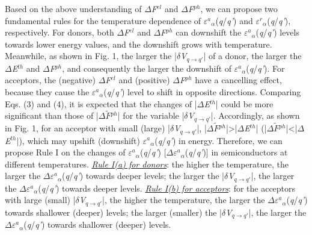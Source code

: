 \documentclass[onecolumn,preprint,superscriptaddress]{revtex4-1}
\begin{document}
Based on the above understanding of $\Delta$\emph{F}$^{el}$ and $\Delta$\emph{F}$^{ph}$, we can propose two fundamental rules for the temperature dependence of $\varepsilon$$^{a}$$_{\alpha}$(\emph{q}/\emph{q'}) and $\varepsilon$$^{r}$$_{\alpha}$(\emph{q}/\emph{q'}), respectively. For donors, both $\Delta$\emph{F}$^{el}$ and $\Delta$\emph{F}$^{ph}$ can downshift the $\varepsilon$$^{a}$$_{\alpha}$(\emph{q}/\emph{q'}) levels towards lower energy values, and the downshift grows with temperature. Meanwhile, as shown in Fig. 1, the larger the |$\delta$\emph{V}$_{q\rightarrow q'}$| of a donor, the larger the $\Delta$\emph{E}$^{th}$ and $\Delta$\emph{F}$^{ph}$, and consequently the larger the downshift of $\varepsilon$$^{a}$$_{\alpha}$(\emph{q}/\emph{q'}). For acceptors, the (negative) $\Delta$\emph{F}$^{el}$ and (positive) $\Delta$\emph{F}$^{ph}$ have a cancelling effect, because they cause the $\varepsilon$$^{a}$$_{\alpha}$(\emph{q}/\emph{q'}) level to shift in opposite directions. Comparing Eqs. (3) and (4), it is expected that the changes of |$\Delta$\emph{E}$^{th}$| could be more significant than those of |$\Delta$$\widetilde{F}$$^{ph}$| for the variable |$\delta$\emph{V}$_{q\rightarrow q'}$|. Accordingly, as shown in Fig. 1, for an acceptor with small (large) |$\delta$\emph{V}$_{q\rightarrow q'}$|, |$\Delta$$\widetilde{F}$$^{ph}$|>|$\Delta$\emph{E}$^{th}$| (|$\Delta$$\widetilde{F}$$^{ph}$|<|$\Delta$\emph{E}$^{th}$|), which may upshift (downshift) $\varepsilon$$^{a}$$_{\alpha}$(\emph{q}/\emph{q'}) in energy. Therefore, we can propose Rule I on the changes of $\varepsilon$$^{a}$$_{\alpha}$(\emph{q}/\emph{q'}) [$\Delta$$\varepsilon$$^{a}$$_{\alpha}$(\emph{q}/\emph{q'})] in semiconductors at different temperatures. \underline{\emph{Rule I(a) for donors}}: the higher the temperature, the larger the $\Delta$$\varepsilon$$^{a}$$_{\alpha}$(\emph{q}/\emph{q'}) towards deeper levels; the larger the |$\delta$\emph{V}$_{q\rightarrow q'}$|, the larger the $\Delta$$\varepsilon$$^{a}$$_{\alpha}$(\emph{q}/\emph{q'}) towards deeper levels. \underline{\emph{Rule I(b) for acceptors}}: for the acceptors with large (small) |$\delta$\emph{V}$_{q\rightarrow q'}$|, the higher the temperature, the larger the $\Delta$$\varepsilon$$^{a}$$_{\alpha}$(\emph{q}/\emph{q'}) towards shallower (deeper) levels; the larger (smaller) the |$\delta$\emph{V}$_{q\rightarrow q'}$|, the larger the $\Delta$$\varepsilon$$^{a}$$_{\alpha}$(\emph{q}/\emph{q'}) towards shallower (deeper) levels.
\end{document}
